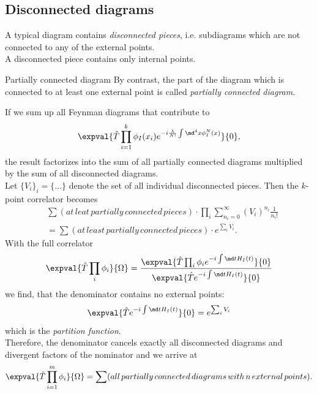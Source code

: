 \subsection{Disconnected diagrams}
A typical diagram contains \emph{disconnected pieces}, i.e. subdiagrams which are not connected to any of the external points.\\
A disconnected piece contains only internal points. \\
\begin{mybox}{Partially connected diagram}
	By contrast, the part of the diagram which is connected to at least one external point is called \emph{partially connected diagram}.
\end{mybox}
If we sum up all Feynman diagrams that contribute to
\begin{equation}
	\expval{\hat{T} \prod_{i=1}^{k} \phi_I(x_i) e^{-i \frac{\lambda}{N!} \int \md^4 x \phi^N_I(x)}}{0},
\end{equation}
the result factorizes into the sum of all partially connected diagrams multiplied by the sum of all disconnected diagrams.\\
Let $\{V_i\}_i = \{\dots \}$  denote the set of all individual disconnected pieces. Then the $k$-point correlator becomes
\begin{align}
&	\sum(at\,leat\,partially\,connected\,pieces) \cdot \prod_i \sum_{n_i=0}^{\infty} (V_i)^{n_i} \frac{1}{n_i !} \\
&= \sum(at \, least\, partially\, connected\, pieces) \cdot e^{\sum_i V_i}.
\end{align}
With the full correlator 
\begin{equation}
	\expval{\hat{T}\prod_i \phi_i}{\Omega} = \frac{\expval{\hat{T} \prod_i \phi_i e^{-i \int \md t H_I(t)     } }{0}}{\expval{\hat{T}e^{-i \int \md t H_I(t)} }{0}}
\end{equation}
we find, that the denominator contains no external points:
\begin{equation}
	\expval{\hat{T} e^{-i \int \md t H_I(t)} }{0} = e^{\sum_i V_i} 
\end{equation}
which is the \emph{partition function}.\\
Therefore, the denominator cancels exactly all disconnected diagrams and divergent factors of the nominator and we arrive at
\begin{equation}
	\expval{\hat{T} \prod_{i=1}^{m} \phi_i }{\Omega} =\sum(all\,partially\,connected\,diagrams\, with\, n\, external \, points).
\end{equation}

